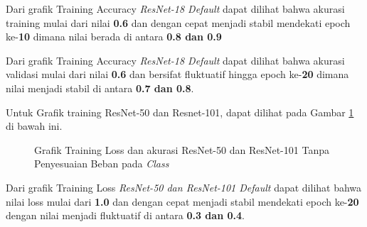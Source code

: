 Dari grafik Training Accuracy \emph{ResNet-18 Default} dapat dilihat bahwa akurasi training mulai dari nilai \textbf{0.6} dan dengan cepat menjadi stabil mendekati epoch ke-\textbf{10} dimana nilai berada di antara \textbf{0.8 dan 0.9} 

Dari grafik Training Accuracy \emph{ResNet-18 Default} dapat dilihat bahwa akurasi validasi mulai dari nilai \textbf{0.6} dan bersifat fluktuatif hingga epoch ke-\textbf{20} dimana nilai menjadi stabil di antara \textbf{0.7 dan 0.8}.

Untuk Grafik training ResNet-50 dan Resnet-101, dapat dilihat pada Gambar \ref{Fig:GraphTrainingDefPt2} di bawah ini.
\pagebreak

\begin{figure}[hbtp]
	\centering
	\qquad
	\caption{Grafik Training Loss dan akurasi ResNet-50 dan ResNet-101 Tanpa Penyesuaian Beban pada \emph{Class}}
	\label{Fig:GraphTrainingDefPt2}
\end{figure}
Dari grafik Training Loss \emph{ResNet-50 dan ResNet-101 Default} dapat dilihat bahwa nilai loss mulai dari \textbf{1.0} dan dengan cepat menjadi stabil mendekati epoch ke-\textbf{20} dengan nilai menjadi fluktuatif di antara \textbf{0.3 dan 0.4}.

